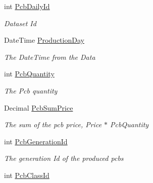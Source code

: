 \begin{DoxyCompactItemize}
\item 
int \hyperlink{classkpi_mvc_api_1_1_data_transfer_objects_1_1_production_data_dto_ada9471296e56fbddf87a940ed1b1b88f}{Pcb\+Daily\+Id}
\begin{DoxyCompactList}\small\item\em Dataset Id \end{DoxyCompactList}\item 
Date\+Time \hyperlink{classkpi_mvc_api_1_1_data_transfer_objects_1_1_production_data_dto_a9a9631598c932f090384ec903880ca67}{Production\+Day}
\begin{DoxyCompactList}\small\item\em The Date\+Time from the Data \end{DoxyCompactList}\item 
int \hyperlink{classkpi_mvc_api_1_1_data_transfer_objects_1_1_production_data_dto_a3408775cae304e2a6cd4c5b552c3297c}{Pcb\+Quantity}
\begin{DoxyCompactList}\small\item\em The Pcb quantity \end{DoxyCompactList}\item 
Decimal \hyperlink{classkpi_mvc_api_1_1_data_transfer_objects_1_1_production_data_dto_a768d34bc3027bf583498fa08ee235e0c}{Pcb\+Sum\+Price}
\begin{DoxyCompactList}\small\item\em The sum of the pcb price, Price $\ast$ Pcb\+Quantity \end{DoxyCompactList}\item 
int \hyperlink{classkpi_mvc_api_1_1_data_transfer_objects_1_1_production_data_dto_a2e933cf5f6b7ff45d576328969e0c36e}{Pcb\+Generation\+Id}
\begin{DoxyCompactList}\small\item\em The generation Id of the produced pcbs \end{DoxyCompactList}\item 
int \hyperlink{classkpi_mvc_api_1_1_data_transfer_objects_1_1_production_data_dto_a5f3110f6e0132a9e86e0aac45f624a2b}{Pcb\+Class\+Id}

\end{DoxyCompactItemize}
